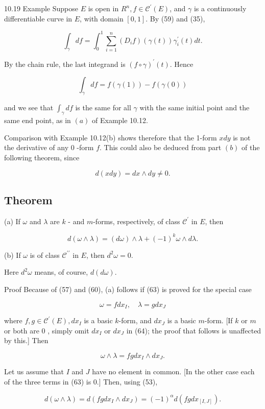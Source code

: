 \documentclass[10pt]{article}
\begin{document}
10.19 Example Suppose $E$ is open in $R^{n}, f \in \mathscr{C}^{\prime}(E)$, and $\gamma$ is a continuously differentiable curve in $E$, with domain $[0,1]$. By (59) and (35),

$$
\int_{\gamma} d f=\int_{0}^{1} \sum_{i=1}^{n}\left(D_{i} f\right)(\gamma(t)) \gamma_{i}^{\prime}(t) d t .
$$

By the chain rule, the last integrand is $(f \circ \gamma)^{\prime}(t)$. Hence

$$
\int_{\gamma} d f=f(\gamma(1))-f(\gamma(0))
$$

and we see that $\int_{\gamma} d f$ is the same for all $\gamma$ with the same initial point and the same end point, as in $(a)$ of Example 10.12.

Comparison with Example 10.12(b) shows therefore that the 1-form $x d y$ is not the derivative of any 0 -form $f$. This could also be deduced from part $(b)$ of the following theorem, since

$$
d(x d y)=d x \wedge d y \neq 0 .
$$

\subsection{Theorem}
(a) If $\omega$ and $\lambda$ are $k$ - and $m$-forms, respectively, of class $\mathscr{C}^{\prime}$ in $E$, then

$$
d(\omega \wedge \lambda)=(d \omega) \wedge \lambda+(-1)^{k} \omega \wedge d \lambda .
$$

(b) If $\omega$ is of class $\mathscr{C}^{\prime \prime}$ in $E$, then $d^{2} \omega=0$.

Here $d^{2} \omega$ means, of course, $d(d \omega)$.

Proof Because of (57) and (60), (a) follows if (63) is proved for the special case

$$
\omega=f d x_{I}, \quad \lambda=g d x_{J}
$$

where $f, g \in \mathscr{C}^{\prime}(E), d x_{I}$ is a basic $k$-form, and $d x_{J}$ is a basic $m$-form. [If $k$ or $m$ or both are 0 , simply omit $d x_{I}$ or $d x_{J}$ in (64); the proof that follows is unaffected by this.] Then

$$
\omega \wedge \lambda=f g d x_{I} \wedge d x_{J} .
$$

Let us assume that $I$ and $J$ have no element in common. [In the other case each of the three terms in (63) is 0.] Then, using (53),

$$
d(\omega \wedge \lambda)=d\left(f g d x_{I} \wedge d x_{J}\right)=(-1)^{\alpha} d\left(f g d x_{[I, J]}\right) .
$$
\end{document}
